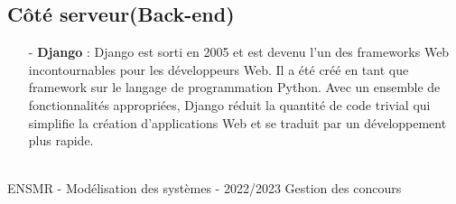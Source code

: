 \subsection{Côté serveur(Back-end)}
\begin{itemize}
	\item[-] \textbf{Django} : Django est sorti en 2005 et est devenu l’un des frameworks Web incontournables pour les développeurs Web. Il a été créé en 
    tant que framework sur le langage de programmation Python. Avec un ensemble de fonctionnalités appropriées, Django réduit la quantité de code 
    trivial qui simplifie la création d’applications Web et se traduit par un développement plus rapide.
\end{itemize}

\vfill
\noindent\makebox[\linewidth]{\rule{.8\paperwidth}{.6pt}}\\[0.2cm]
ENSMR - Modélisation des systèmes - 2022/2023 \hfill Gestion des concours
\noindent\makebox[\linewidth]{\rule{.8\paperwidth}{.6pt}}
\newpage